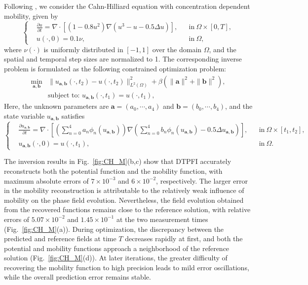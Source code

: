\documentclass[11pt,reqno]{amsart}
\begin{document}
Following \cite{zhu1999coarsening}, we consider the Cahn-Hilliard equation with concentration dependent mobility, given by  
\begin{equation}  
\left\{  
\begin{aligned}  
&\frac{\partial u}{\partial t} = \nabla\cdot \left[(1-0.8u^2)\nabla (u^3-u-0.5\Delta u)\right],&&\text{in}\ \Omega\times [0,T],\\  
&u(\cdot,0) = 0.1\nu, &&\text{in}\ \Omega,  
\end{aligned}  
\right.  
\end{equation}  
where $\nu(\cdot)$ is uniformly distributed in $[-1,1]$ over the domain $\Omega$, and the spatial and temporal step sizes are normalized to 1. The corresponding inverse problem is formulated as the following constrained optimization problem:  
\begin{align*}  
\min\limits_{\mathbf{a},\mathbf{b}} &\|u_{\mathbf{a},\mathbf{b}}(\cdot,t_2)-u(\cdot,t_2)\|_{L^2(\Omega)}^2+\beta (\|\mathbf{a}\|^2+\|\mathbf{b}\|^2), \\  
&\text{subject to: } u_{\mathbf{a},\mathbf{b}}(\cdot,t_1) = u(\cdot,t_1),  
\end{align*}  
Here, the unknown parameters are \(\mathbf{a}=(a_0,\cdots,a_4)\) and \(\mathbf{b}=(b_0,\cdots,b_4)\), and the state variable \(u_{\mathbf{a},\mathbf{b}}\) satisfies  
\begin{equation}  
\left\{  
\begin{aligned}  
&\frac{\partial u_{\mathbf{a},\mathbf{b}}}{\partial t} = \nabla\cdot \left[\left(\sum\limits_{n=0}^4 a_n\phi_n(u_{\mathbf{a},\mathbf{b}})\right)\nabla \left(\sum\limits_{n=0}^4 b_n\phi_n(u_{\mathbf{a},\mathbf{b}})-0.5 \Delta u_{\mathbf{a},\mathbf{b}}\right)\right],&&\text{in}\ \Omega\times [t_1,t_2],\\  
&u_{\mathbf{a},\mathbf{b}}(\cdot,0) = u(\cdot,t_1), &&\text{in}\ \Omega.  
\end{aligned}  
\right.  
\end{equation}

The inversion results in Fig.~\ref{fig:CH_M}(b,c) show that DTPFI accurately reconstructs both the potential function and the mobility function, with maximum absolute errors of $7\times 10^{-3}$ and $6\times 10^{-2}$, respectively. The larger error in the mobility reconstruction is attributable to the relatively weak influence of mobility on the phase field evolution. Nevertheless, the field evolution obtained from the recovered functions remains close to the reference solution, with relative errors of $5.07\times 10^{-2}$ and $1.45\times 10^{-1}$ at the two measurement times (Fig.~\ref{fig:CH_M}(a)). During optimization, the discrepancy between the predicted and reference fields at time \(T\) decreases rapidly at first, and both the potential and mobility functions approach a neighborhood of the reference solution (Fig.~\ref{fig:CH_M}(d)). At later iterations, the greater difficulty of recovering the mobility function to high precision leads to mild error oscillations, while the overall prediction error remains stable.
\end{document}

